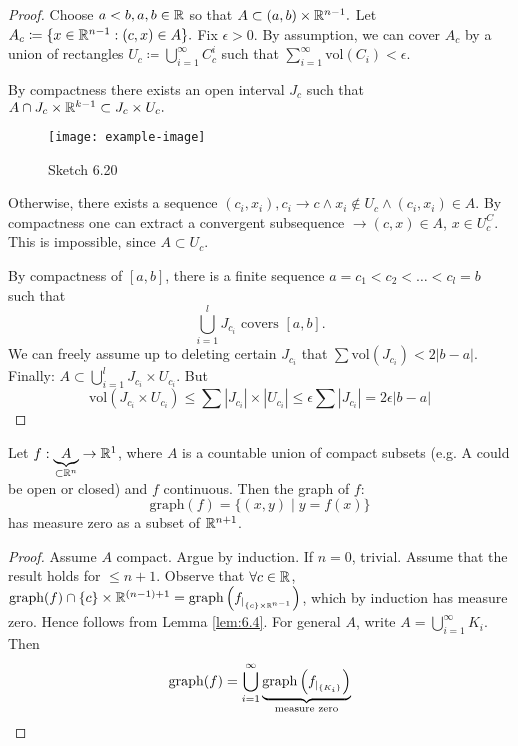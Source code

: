 \begin{proof}
    Choose \(a<b,a,b\in \mathbb{R}\) so that \(A\subset (a,b)\times \mathbb{R}^{n-1}.\) Let \(A_c\coloneqq\{x\in\mathbb{R}^{n-1}:(c,x)\in A\}.\)
    Fix \(\epsilon>0.\) By assumption, we can cover \(A_c\) by a union of rectangles \(U_c\coloneqq \bigcup_{i=1}^\infty C_c^i\)
    such that \(\sum_{i=1}^\infty\text{vol} (C_i)<\epsilon\).

    By compactness there exists an open interval \(J_c\) such that \(A\cap J_c\times \mathbb{R}^{k-1}\subset J_c\times U_c.\)
    \begin{figure}[H]\label{fig:6.20}
        \centering
        \texttt{[image: example-image]}
        \caption{Sketch 6.20}
    \end{figure}
    Otherwise, there exists a sequence \((c_i,x_i),c_i\to c\land x_i\notin U_c\land (c_i,x_i)\in A\). By compactness one can extract a 
    convergent subsequence \(\to (c,x)\in A\), \(x\in U_c^C\). This is impossible, since 
    \(A\subset U_c\). 

    By compactness of \([a,b]\), there is a finite sequence \(a=c_1<c_2<\dots<c_l=b\) such that 
    \[\bigcup_{i=1}^l J_{c_i}\text{ covers } [a,b].\]
    We can freely assume up to deleting certain \(J_{c_i}\) that \(\sum \text{vol}(J_{c_i})<2|b-a|\). 
    Finally: \(A\subset \bigcup_{i=1}^l J_{c_i}\times U_{c_i}\). But 
    \[\text{vol}(J_{c_i}\times U_{c_i})\leq \sum |J_{c_i}|\times |U_{c_i}|\leq \epsilon\sum |J_{c_i}|=2\epsilon|b-a|\]
\end{proof}

\begin{corollary}\label{cor:6.5}
    Let \(f:\underbrace{A}_{\subset \mathbb{R}^n}\to\mathbb{R}^{1}\), where \(A\) is a countable union of compact subsets (e.g. A could be open or closed) and \(f\) continuous.
    Then the graph of \(f\): \[\text{graph}(f)=\{(x,y)\mid y=f(x)\}\]
    has measure zero as a subset of \(\mathbb{R}^{n+1}\). 
\end{corollary}

\begin{proof}
    Assume \(A\) compact. Argue by induction. If \(n=0\), trivial. Assume that the result holds for \(\leq n+1\).
    Observe that \(\forall c\in\mathbb{R}\), \(\text{graph}(f)\cap\{c\}\times \mathbb{R}^{(n-1)+1}=\text{graph}\left(f_{|_{\{c\}\times \mathbb{R}^{n-1}}}\right)\), which by induction has measure zero. 
    Hence follows from Lemma \ref{lem:6.4}. For general \(A\), write \(A=\bigcup_{i=1}^\infty K_i\). Then 
    \[\text{graph}(f)=\bigcup_{i=1}^\infty\underbrace{\text{graph}\left(f_{|_{\{K_i\}}}\right)}_{\text{measure zero}}\]
\end{proof}

